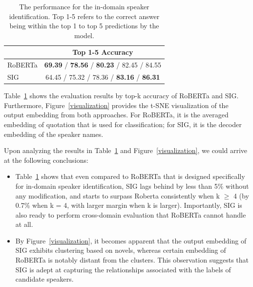 \documentclass[letterpaper]{article} %
\begin{document}
\begin{table}[htbp!]
    \centering
    \begin{tabular}{l |c}

       \toprule
        & \textbf{Top 1-5 Accuracy}  \\
       \midrule
       RoBERTa  & \textbf{69.39} / \textbf{78.56} / \textbf{80.23} / 82.45 / 84.55 \\
       SIG & 64.45 / 75.32 / 78.36 / \textbf{83.16} / \textbf{86.31} \\
       \bottomrule
    \end{tabular}
    \caption{The performance for the in-domain speaker identification. Top 1-5 refers to the correct answer being within the top 1 to top 5 predictions by the model.}
    \label{tab:id}
\end{table}

Table~\ref{tab:id} shows the evaluation results by top-k accuracy of RoBERTa and SIG. Furthermore, Figure~\ref{visualization} provides the t-SNE visualization of the output embedding from both approaches. For RoBERTa, it is the averaged embedding of quotation that is used for classification; for SIG, it is the decoder embedding of the speaker names.

Upon analyzing the results in Table~\ref{tab:id} and Figure~\ref{visualization}, we could arrive at the following conclusions:
\begin{itemize}
    \item Table~\ref{tab:id} shows that even compared to RoBERTa that is designed specifically for in-domain speaker identification, SIG lags behind by less than 5\% without any modification, and starts to surpass Roberta consistently when k $\geq $ 4 (by 0.7\% when k = 4, with larger margin when k is larger). Importantly, SIG is also ready to perform cross-domain evaluation that RoBERTa cannot handle at all.
    \item By Figure~\ref{visualization}, it becomes apparent that the output embedding of SIG exhibits clustering based on novels, whereas certain embedding of RoBERTa is notably distant from the clusters. This observation suggests that SIG is adept at capturing the relationships associated with the labels of candidate speakers.
\end{itemize}
\end{document}
